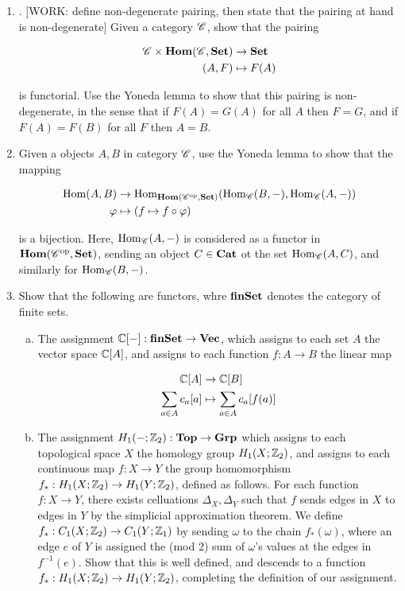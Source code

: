 \documentclass{article}
\theoremstyle{definition}
\numberwithin{figure}{section}
\begin{document}
\begin{enumerate}[\thesection .1.]
\item . [WORK: define non-degenerate pairing, then state that the pairing at hand is non-degenerate] Given a category $\mathscr{C}$, show that the pairing

\begin{align*}
\mathscr{C} \times \bold{Hom}(\mathscr{C},\bold{Set})&\to\bold{Set}\\
(A,F)&\mapsto F(A)
\end{align*}

is functorial. Use the Yoneda lemma to show that this pairing is non-degenerate, in the sense that if $F(A)=G(A)$ for all $A$ then $F=G$, and if $F(A)=F(B)$ for all $F$ then $A=B$.

\item Given a objects $A,B$ in category $\mathscr{C}$, use the Yoneda lemma to show that the mapping

\begin{align*}
\mathrm{Hom}(A,B)&\to \mathrm{Hom}_{\bold{Hom}(\mathscr{C}^{\mathrm{op}},\bold{Set})}(\mathrm{Hom}_{\mathscr{C}}(B,\--),\mathrm{Hom}_{\mathscr{C}}(A,\--))\\
\varphi & \mapsto \left(f\mapsto f\circ \varphi\right)
\end{align*}

is a bijection. Here, $\mathrm{Hom}_{\mathscr{C}}(A,\--)$ is considered as a functor in $\bold{Hom}(\mathscr{C}^{\mathrm{op}},\bold{Set})$, sending an object $C\in \bold{Cat}$ ot the set $\mathrm{Hom}_{\mathscr{C}}(A,C)$, and similarly for $\mathrm{Hom}_{\mathscr{C}}(B,\--)$.

\item Show that the following are functors, whre $\bold{finSet}$ denotes the category of finite sets.

\begin{enumerate}[(a)]
\item The assignment $\mathbb{C}[\--]:\bold{finSet}\to\bold{Vec}$, which assigns to each set $A$ the vector space $\mathbb{C}[A]$, and assigns to each function $f:A\to B$ the linear map

\begin{align*}
\mathbb{C}[A]&\xrightarrow{} \mathbb{C}[B]\\
\sum_{a\in A}c_a [a]&\mapsto \sum_{a\in A}c_a[f(a)]
\end{align*}

\item The assignment $H_1(\--;\mathbb{Z}_2):\bold{Top}\to \bold{Grp}$ which assigns to each topological space $X$ the homology group $H_1(X;\mathbb{Z}_2)$, and assigns to each continuous map $f:X\to Y$ the group homomorphism $f_*: H_1(X;\mathbb{Z}_2)\to H_1(Y;\mathbb{Z}_2)$, defined as follows. For each function $f:X\to Y$, there exists celluations $\Delta_X,\Delta_Y$ such that $f$ sends edges in $X$ to edges in $Y$ by the simplicial approximation theorem. We define $f_*:C_1(X;\mathbb{Z}_2)\to C_1(Y;\mathbb{Z}_1)$ by sending $\omega$ to the chain $f_*(\omega)$, where an edge $e$ of $Y$ is assigned the (mod 2) sum of $\omega$'s values at the edges in $f^{-1}(e)$. Show that this is well defined, and descends to a function $f_*:H_1(X;\mathbb{Z}_2)\to H_1(Y;\mathbb{Z}_2)$, completing the definition of our assignment.
\end{enumerate}


\end{enumerate}
\end{document}
